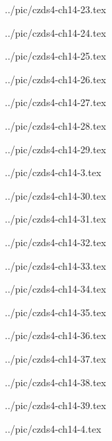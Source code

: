 ../pic/czds4-ch14-23.tex



../pic/czds4-ch14-24.tex



../pic/czds4-ch14-25.tex



../pic/czds4-ch14-26.tex



../pic/czds4-ch14-27.tex



../pic/czds4-ch14-28.tex



../pic/czds4-ch14-29.tex



../pic/czds4-ch14-3.tex



../pic/czds4-ch14-30.tex



../pic/czds4-ch14-31.tex



../pic/czds4-ch14-32.tex



../pic/czds4-ch14-33.tex



../pic/czds4-ch14-34.tex



../pic/czds4-ch14-35.tex



../pic/czds4-ch14-36.tex



../pic/czds4-ch14-37.tex



../pic/czds4-ch14-38.tex



../pic/czds4-ch14-39.tex



../pic/czds4-ch14-4.tex




